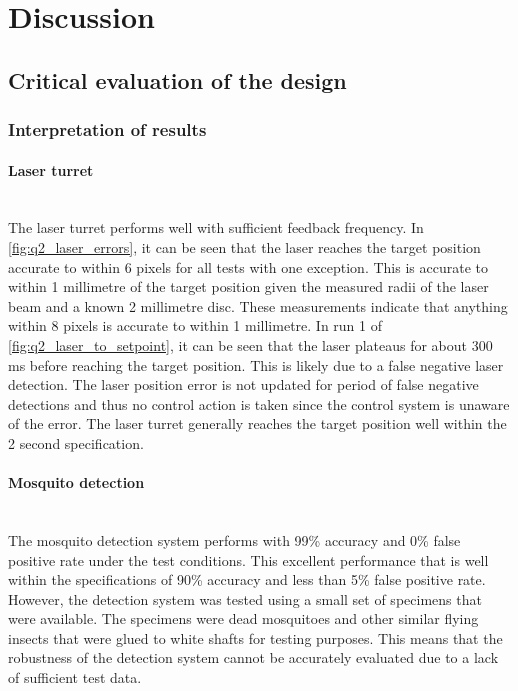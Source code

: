
\section{Discussion}

\subsection{Critical evaluation of the design}

\subsubsection{Interpretation of results}
\paragraph{Laser turret}\hfill\\
The laser turret performs well with sufficient feedback frequency. In \autoref{fig:q2_laser_errors}, it can be seen that the laser reaches the target position accurate to within 6 pixels for all tests with one exception. This is accurate to within 1 millimetre of the target position given the measured radii of the laser beam and a known 2 millimetre disc. These measurements indicate that anything within 8 pixels is accurate to within 1 millimetre. In run 1 of \autoref{fig:q2_laser_to_setpoint}, it can be seen that the laser plateaus for about 300\,ms before reaching the target position. This is likely due to a false negative laser detection. The laser position error is not updated for period of false negative detections and thus no control action is taken since the control system is unaware of the error. The laser turret generally reaches the target position well within the 2 second specification.

\paragraph{Mosquito detection}\hfill\\
The mosquito detection system performs with 99\% accuracy and 0\% false positive rate under the test conditions. This excellent performance that is well within the specifications of 90\% accuracy and less than 5\% false positive rate. However, the detection system was tested using a small set of  specimens that were available. The specimens were dead mosquitoes and other similar flying insects that were glued to white shafts for testing purposes. This means that the robustness of the detection system cannot be accurately evaluated due to a lack of sufficient test data.


